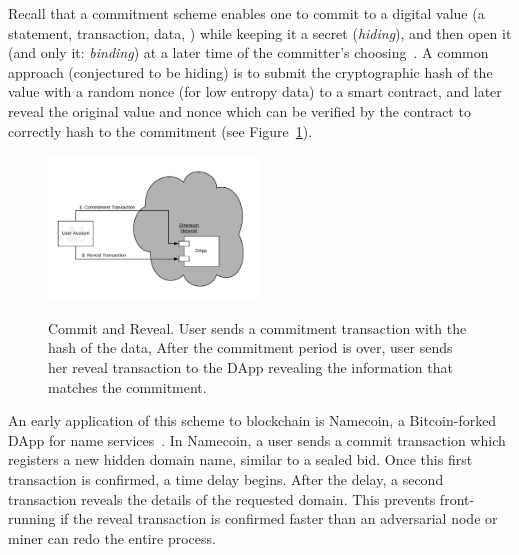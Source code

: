 Recall that a commitment scheme enables one to commit to a digital value (\eg a statement, transaction, data, \etc) while keeping it a secret (\textit{hiding}), and then open it (and only it: \textit{binding}) at a later time of the committer's choosing~\cite{brassard1988minimum}. A common approach (conjectured to be hiding) is to submit the cryptographic hash of the value with a random nonce (for low entropy data) to a smart contract, and later reveal the original value and nonce which can be verified by the contract to correctly hash to the commitment (see Figure~\ref{fig:commitReveal}).

\begin{figure}[t]
    \centering
{\includegraphics[width=0.5\textwidth]{figures/commit-reveal.png}}
{\caption[Commit and Reveal Mechanism]{Commit and Reveal. User sends a commitment transaction with the hash of the data, After the commitment period is over, user sends her reveal transaction to the DApp revealing the information that matches the commitment.}\label{fig:commitReveal}}
\end{figure}

An early application of this scheme to blockchain is Namecoin, a Bitcoin-forked DApp for name services~\cite{kalodner2015empirical}. In Namecoin, a user sends a commit transaction which registers a new hidden domain name, similar to a sealed bid. Once this first transaction is confirmed, a time delay begins. After the delay, a second transaction reveals the details of the requested domain. This prevents front-running if the reveal transaction is confirmed faster than an adversarial node or miner can redo the entire process.

